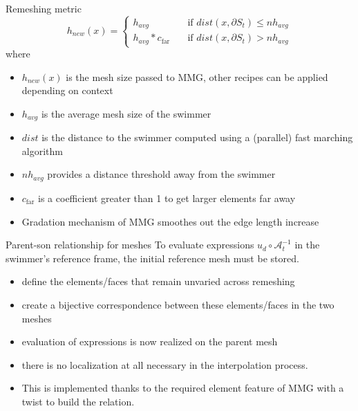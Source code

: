 \documentclass{beamer}
\begin{document}
\begin{frame}{Remeshing metric}
	\begin{equation*}
		h_{new}(x) = 
		\left\{
		\begin{aligned}
			h_{avg} &\quad \text{if $dist(x,\partial S_t) \le nh_{avg} $}\\
			h_{avg}*c_\mathrm{far}	 &\quad \text{if $dist(x,\partial S_t) > nh_{avg} $}
		\end{aligned}
		\right.
	\end{equation*}
	where 
	\begin{itemize}
		\item $h_{new}(x)$ is the mesh size passed to MMG, other recipes can be applied depending on context
		\item $h_{avg}$ is the average mesh size of the swimmer
		\item $dist$ is the distance to the swimmer computed using a (parallel) fast marching algorithm
		\item $nh_{avg}$ provides a distance threshold away from the swimmer
		\item $c_{\mathrm{far}}$ is a coefficient greater than 1 to get larger elements far away
		\item Gradation mechanism of MMG smoothes out the edge length increase
	\end{itemize}
\end{frame}
	\begin{frame}{Parent-son relationship for meshes}
		To evaluate expressions $u_d \circ \mathcal{A}_t^{-1}$ in the swimmer's reference frame, the initial reference mesh must be stored.
		\begin{itemize}
			\item define the elements/faces that remain unvaried across remeshing
			\item create a bijective correspondence between these elements/faces in the two meshes
			\item evaluation of  expressions is now realized on the parent mesh
			\item there is no localization at all necessary in the interpolation process.
			\item This is implemented thanks to the required element feature of MMG with a twist to build the relation.
		\end{itemize}
	\end{frame}
\end{document}
